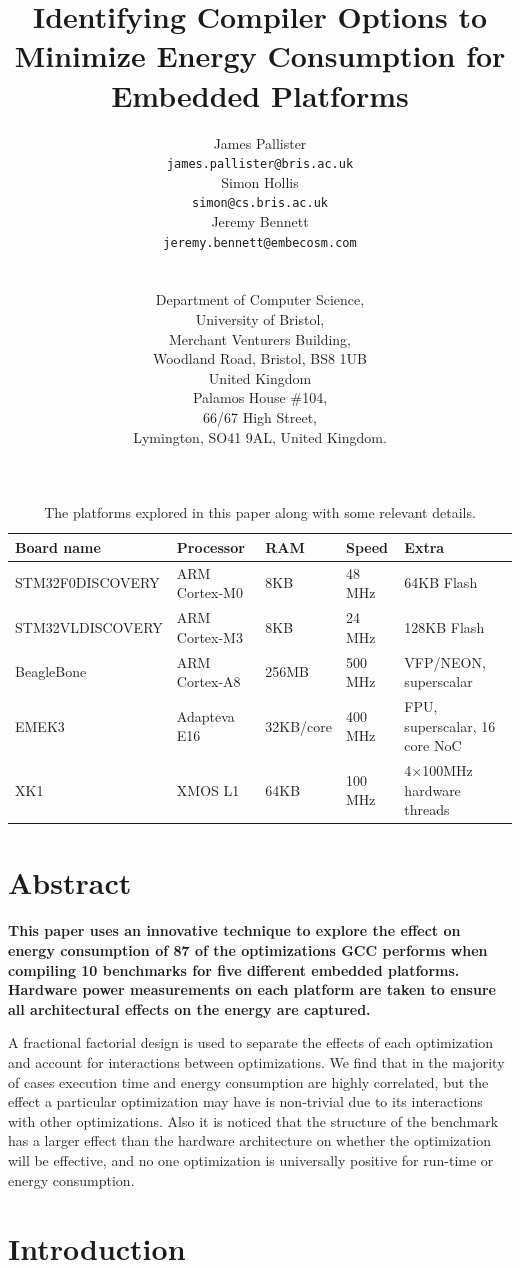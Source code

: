 \documentclass[twocolumn]{article}
\title{\bfseries\fontsize{20}{1}\selectfont Identifying Compiler Options to Minimize Energy Consumption for Embedded Platforms}
\author{
\parbox{0.33\linewidth}{\centering\fontsize{13}{1}\selectfont James Pallister\\[0.5em]\texttt{james.pallister@bris.ac.uk}}
\parbox{0.33\linewidth}{\centering\fontsize{13}{1}\selectfont Simon Hollis\\[0.5em]\texttt{simon@cs.bris.ac.uk}}
\parbox{0.33\linewidth}{\centering\fontsize{13}{1}\selectfont Jeremy Bennett\\[0.5em]\texttt{jeremy.bennett@embecosm.com}} \\[1.5em]
\parbox{0.66\linewidth}{\centering\fontsize{12}{1}\selectfont
Department of Computer Science, \\
University of Bristol, \\
Merchant Venturers Building, \\
Woodland Road, Bristol, BS8 1UB\\
United Kingdom}
\parbox{0.33\linewidth}{\centering\fontsize{13}{1}\selectfont
Palamos House \#104, \\
66/67 High Street, \\
Lymington, SO41 9AL, United Kingdom. \\
}
}
\date{}
\let\oldcaption\caption
\renewcommand{\caption}[1]{\oldcaption{\textup{#1}}}
\begin{document}
\maketitle
\begin{table}[!hbt]
	\centering
	\begin{tabular}{l l l l l}
		\textbf{Board name} & \textbf{Processor} & \textbf{RAM} & \textbf{Speed} & \textbf{Extra} \\
		\hline
		STM32F0DISCOVERY	& ARM Cortex-M0 		& 8KB		& 48 MHz		  & 64KB Flash\\
		STM32VLDISCOVERY	& ARM Cortex-M3 		& 8KB		& 24 MHz		  & 128KB Flash\\
		BeagleBone			& ARM Cortex-A8 		& 256MB		& 500 MHz		  & VFP/NEON, superscalar\\
		EMEK3				& Adapteva E16 			& 32KB/core & 400 MHz		  & FPU, superscalar, 16 core NoC\\
		XK1					& XMOS L1 				& 64KB		& 100 MHz 		& 4$\times$100MHz hardware threads \\
	\end{tabular}
	\caption{The platforms explored in this paper along with some relevant details.}
	\label{Table:Platforms}
\end{table}

\section{Abstract}

{\bfseries
This paper uses an innovative technique to explore the effect on energy consumption of 87 of the optimizations GCC performs when compiling 10 benchmarks for five different embedded platforms. Hardware power measurements on each platform are taken to ensure all architectural effects on the energy are captured.

A fractional factorial design is used to separate the effects of each optimization and account for interactions between optimizations. We find that in the majority of cases execution time and energy consumption are highly correlated, but the effect a particular optimization may have is non-trivial due to its interactions with other optimizations. Also it is noticed that the structure of the benchmark has a larger effect than the hardware architecture on whether the optimization will be effective, and no one optimization is universally positive for run-time or energy consumption.
}

\section{Introduction}
\end{document}
